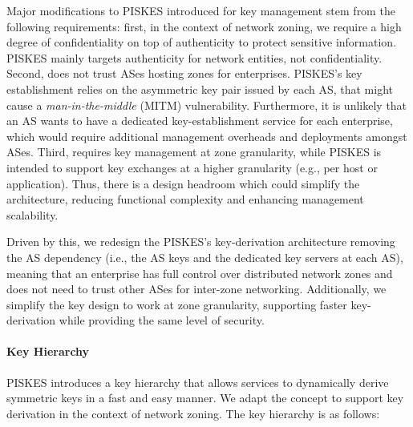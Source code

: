 Major modifications to PISKES introduced for \name key management stem from the following requirements: first,
in the context of network zoning, we require a high degree of confidentiality on top of
authenticity to protect sensitive information. PISKES mainly targets authenticity for
network entities, not confidentiality. Second, \name does not trust ASes hosting zones
for enterprises. PISKES's key establishment relies on the asymmetric key pair issued by
each AS, that might cause a \textit{man-in-the-middle} (MITM) vulnerability. Furthermore, it is unlikely that an AS
wants to have a dedicated key-establishment service for each enterprise, which would require
additional management overheads and deployments amongst ASes. Third, \name requires key
management at zone granularity, while PISKES is intended to support key exchanges at a
higher granularity (e.g., per host or application). Thus, there is a design headroom which
could simplify the architecture, reducing functional complexity and enhancing management
scalability.

Driven by this, we redesign the PISKES's key-derivation architecture removing the
AS dependency (i.e., the AS keys and the dedicated key servers at each AS), meaning
that an enterprise has full control over distributed network zones and does not
need to trust other ASes for inter-zone networking. Additionally, we simplify the key
design to work at zone granularity, supporting faster key-derivation while
providing the same level of security.

\paragraph{Key Hierarchy}
PISKES introduces a key hierarchy that allows services to dynamically derive symmetric
keys in a fast and easy manner. We adapt the concept to support key derivation in the
context of network zoning. The key hierarchy is as follows:

